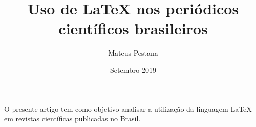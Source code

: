 \documentclass{article}
\title{Uso de \LaTeX{} nos periódicos científicos brasileiros}
\author{Mateus Pestana}
\date{Setembro 2019}
\begin{document}
   \maketitle
   O presente artigo tem como objetivo analisar a utilização da 
   linguagem \LaTeX{} em revistas científicas publicadas no Brasil.  
\end{document}
